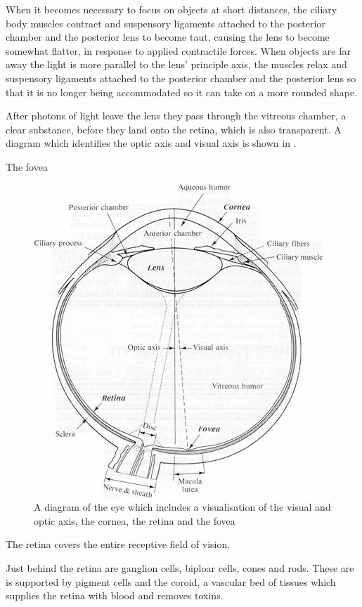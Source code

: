 When it becomes necessary to focus on objects at short distances, the
ciliary body muscles contract and suspensory ligaments attached to the
posterior chamber and the posterior lens to become taut, causing the
lens to become somewhat flatter, in response to applied contractile
forces. When objects are far away the light is more parallel to the
lens' principle axis, the muscles relax and suspensory ligaments
attached to the posterior chamber and the posterior lens so that it
is no longer being accommodated so it can take on a more rounded shape.

After photons of light leave the lens they pass through the vitreous
chamber, a clear substance, before they land onto the retina, which
is also transparent. A diagram which identifies the optic axis and
visual axis is shown in .

The fovea

\begin{figure}[htbp]
  \centering
    \includegraphics{figures/eye_diagram}
  \caption{A diagram of the eye which includes a visualisation of the visual
   and optic axis, the cornea, the retina and the fovea}
  \label{fig:optic_axis}
\end{figure}

The retina covers the entire receptive field of vision. 

Just behind the retina are ganglion cells, biploar cells, cones and rods.
These are is supported by pigment cells and the coroid, a vascular bed
of tissues which supplies the retina with blood and removes toxins.\cite{}

